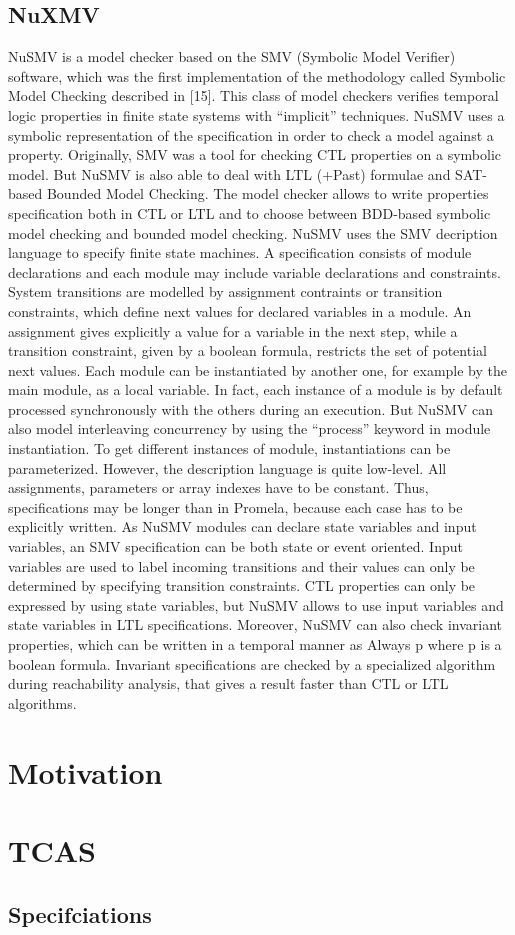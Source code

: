 \documentclass[a4paper,11pt,flegn]{article}
\begin{document}
\subsection{NuXMV}
NuSMV\autocite{1} is a model checker based on the SMV (Symbolic Model Verifier) software, which was the first
implementation of the methodology called Symbolic Model Checking described in [15]. This class of model
checkers verifies temporal logic properties in finite state systems with “implicit” techniques. NuSMV uses
a symbolic representation of the specification in order to check a model against a property. Originally, SMV
was a tool for checking CTL properties on a symbolic model. But NuSMV is also able to deal with LTL
(+Past) formulae and SAT-based Bounded Model Checking. The model checker allows to write properties
specification both in CTL or LTL and to choose between BDD-based symbolic model checking and bounded
model checking.
NuSMV uses the SMV decription language to specify finite state machines. A specification consists of
module declarations and each module may include variable declarations and constraints. System transitions
are modelled by assignment contraints or transition constraints, which define next values for declared variables in a module. An assignment gives explicitly a value for a variable in the next step, while a transition
constraint, given by a boolean formula, restricts the set of potential next values. Each module can be instantiated
by another one, for example by the main module, as a local variable. In fact, each instance of a module
is by default processed synchronously with the others during an execution. But NuSMV can also model
interleaving concurrency by using the “process” keyword in module instantiation. To get different instances
of module, instantiations can be parameterized. However, the description language is quite low-level. All
assignments, parameters or array indexes have to be constant. Thus, specifications may be longer than in
Promela, because each case has to be explicitly written. As NuSMV modules can declare state variables and
input variables, an SMV specification can be both state or event oriented. Input variables are used to label
incoming transitions and their values can only be determined by specifying transition constraints.
CTL properties can only be expressed by using state variables, but NuSMV allows to use input variables
and state variables in LTL specifications. Moreover, NuSMV can also check invariant properties, which
can be written in a temporal manner as Always p where p is a boolean formula. Invariant specifications are
checked by a specialized algorithm during reachability analysis, that gives a result faster than CTL or LTL
algorithms.
\section{Motivation}
\section{TCAS}
\subsection{Specifciations}
\end{document}
